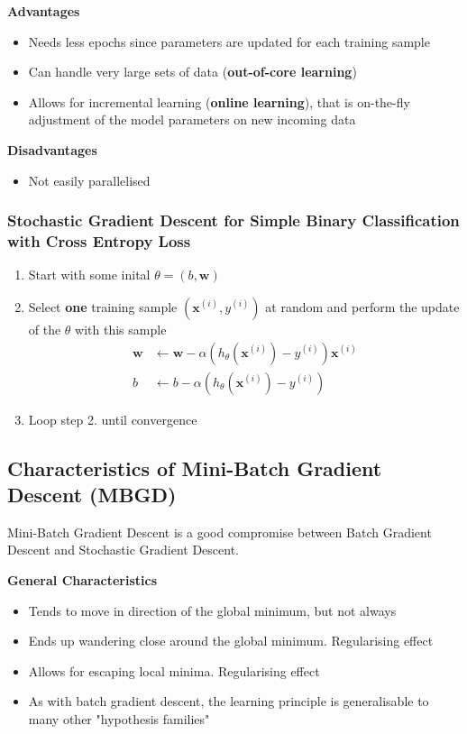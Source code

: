 \documentclass[11pt]{article}
\begin{document}
\noindent
\textbf{Advantages}
\begin{itemize}
	\item Needs less epochs since parameters are updated for each training sample
	\item Can handle very large sets of data (\textbf{out-of-core learning})
	\item Allows for incremental learning (\textbf{online learning}), that is on-the-fly adjustment of the model parameters on new incoming data
\end{itemize}

\noindent
\textbf{Disadvantages}
\begin{itemize}
	\item Not easily parallelised
\end{itemize}

\subsubsection{Stochastic Gradient Descent for Simple Binary Classification with Cross Entropy Loss}

\begin{enumerate}
	\item Start with some inital $\theta = (b,\textbf{w})$
	\item Select \textbf{one} training sample $(\textbf{x}^{(i)}, y^{(i)})$ at random and perform the update of the $\theta$ with this sample\\
	\begin{align*}
		\textbf{w} &\leftarrow \textbf{w} - \alpha\left(h_\theta(\textbf{x}^{(i)}) - y^{(i)}\right) \textbf{x}^{(i)}\\
		b &\leftarrow b - \alpha\left(h_\theta(\textbf{x}^{(i)}) - y^{(i)}\right)
	\end{align*}
	\item Loop step 2. until convergence
\end{enumerate}

\subsection{Characteristics of Mini-Batch Gradient Descent (MBGD)}
Mini-Batch Gradient Descent is a good compromise between Batch Gradient Descent and Stochastic Gradient Descent.

\vspace{1em}
\noindent
\textbf{General Characteristics}
\begin{itemize}
	\item Tends to move in direction of the global minimum, but not always
	\item Ends up wandering close around the global minimum. Regularising effect
	\item Allows for escaping local minima. Regularising effect
	\item As with batch gradient descent, the learning principle is generalisable to many other "hypothesis families"
\end{itemize}
\end{document}
